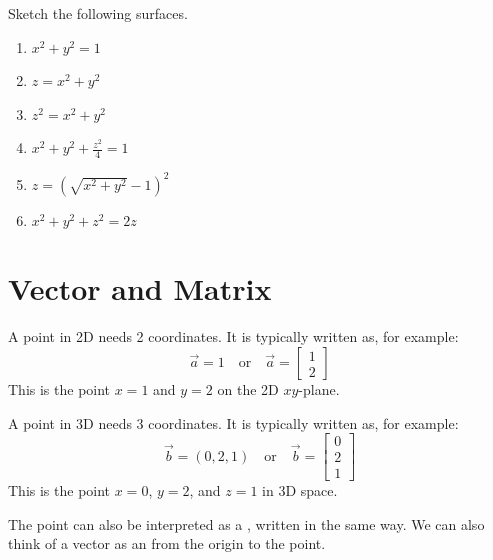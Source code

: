 \documentclass[11pt,fleqn]{book} %
\begin{document}
\begin{exercise}
    Sketch the following surfaces.

    \begin{minipage}[t]{0.45\linewidth} 
        \begin{enumerate}
            \item $x^2 + y^2 = 1$

            \item $z = x^2 + y^2$

            \item $z^2 = x^2 + y^2$
        \end{enumerate}
    \end{minipage}
    \begin{minipage}[t]{0.45\linewidth} 
        \begin{enumerate} \setcounter{enumi}{3}
            \item $x^2 + y^2 + \frac{z^2}{4} = 1$
            \item $z = \left( \sqrt{x^2 + y^2} - 1 \right)^2$
            \item $x^2 + y^2 + z^2 = 2z$
        \end{enumerate}
    \end{minipage}
\end{exercise}

\section{Vector and Matrix}

A point in 2D needs 2 coordinates. It is typically written as, for example: $$\vec{a} = 1 \quad\text{or}\quad \vec{a} = \begin{bmatrix} 1 \\ 2 \end{bmatrix}$$ This is the point $x = 1$ and $y = 2$ on the 2D $xy$-plane.

A point in 3D needs 3 coordinates. It is typically written as, for example: $$\vec{b} = (0, 2, 1) \quad\text{or}\quad \vec{b} = \begin{bmatrix} 0 \\ 2 \\ 1 \end{bmatrix}$$ This is the point $x = 0$, $y = 2$, and $z = 1$ in 3D space.

The point can also be interpreted as a , written in the same way. We can also think of a vector as an  from the origin to the point.
\end{document}
